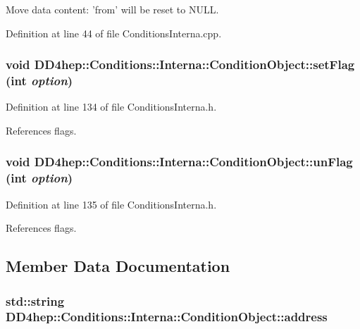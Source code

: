 Move data content: 'from' will be reset to NULL. 

Definition at line 44 of file ConditionsInterna.cpp.\hypertarget{class_d_d4hep_1_1_conditions_1_1_interna_1_1_condition_object_ae060ad7c29aae54e9c6701db35408155}{
\subsubsection[{setFlag}]{\setlength{\rightskip}{0pt plus 5cm}void DD4hep::Conditions::Interna::ConditionObject::setFlag (int {\em option})}}
\label{class_d_d4hep_1_1_conditions_1_1_interna_1_1_condition_object_ae060ad7c29aae54e9c6701db35408155}


Definition at line 134 of file ConditionsInterna.h.

References flags.\hypertarget{class_d_d4hep_1_1_conditions_1_1_interna_1_1_condition_object_ad0e2c621be69101fa71fd96aaff0c15d}{
\subsubsection[{unFlag}]{\setlength{\rightskip}{0pt plus 5cm}void DD4hep::Conditions::Interna::ConditionObject::unFlag (int {\em option})}}
\label{class_d_d4hep_1_1_conditions_1_1_interna_1_1_condition_object_ad0e2c621be69101fa71fd96aaff0c15d}


Definition at line 135 of file ConditionsInterna.h.

References flags.

\subsection{Member Data Documentation}
\hypertarget{class_d_d4hep_1_1_conditions_1_1_interna_1_1_condition_object_ac30708fd16161d507f475cc81419be18}{
\subsubsection[{address}]{\setlength{\rightskip}{0pt plus 5cm}std::string {\bf DD4hep::Conditions::Interna::ConditionObject::address}}}
\label{class_d_d4hep_1_1_conditions_1_1_interna_1_1_condition_object_ac30708fd16161d507f475cc81419be18}


